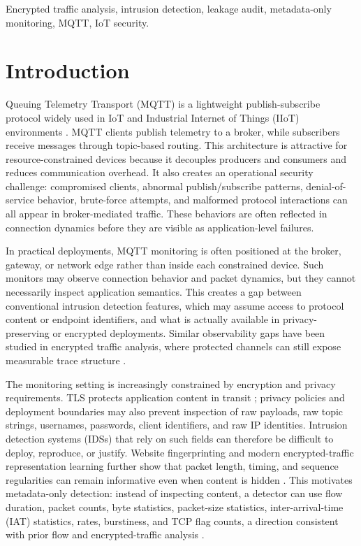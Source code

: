 \documentclass[lettersize,journal]{IEEEtran}
\begin{document}
\begin{IEEEkeywords}
Encrypted traffic analysis, intrusion detection, leakage audit, metadata-only monitoring, MQTT, IoT security.
\end{IEEEkeywords}

\section{Introduction}
\label{sec:introduction}
 Queuing Telemetry Transport (MQTT) is a lightweight publish-subscribe protocol widely used in IoT and Industrial Internet of Things (IIoT) environments \cite{mqtt5,sisinni2018industrial}. MQTT clients publish telemetry to a broker, while subscribers receive messages through topic-based routing. This architecture is attractive for resource-constrained devices because it decouples producers and consumers and reduces communication overhead. It also creates an operational security challenge: compromised clients, abnormal publish/subscribe patterns, denial-of-service behavior, brute-force attempts, and malformed protocol interactions can all appear in broker-mediated traffic. These behaviors are often reflected in connection dynamics before they are visible as application-level failures.

In practical deployments, MQTT monitoring is often positioned at the broker, gateway, or network edge rather than inside each constrained device. Such monitors may observe connection behavior and packet dynamics, but they cannot necessarily inspect application semantics. This creates a gap between conventional intrusion detection features, which may assume access to protocol content or endpoint identifiers, and what is actually available in privacy-preserving or encrypted deployments. Similar observability gaps have been studied in encrypted traffic analysis, where protected channels can still expose measurable trace structure \cite{dyer2012peekaboo}.

The monitoring setting is increasingly constrained by encryption and privacy requirements. TLS protects application content in transit \cite{rfc8446}; privacy policies and deployment boundaries may also prevent inspection of raw payloads, raw topic strings, usernames, passwords, client identifiers, and raw IP identities. Intrusion detection systems (IDSs) that rely on such fields can therefore be difficult to deploy, reproduce, or justify. Website fingerprinting and modern encrypted-traffic representation learning further show that packet length, timing, and sequence regularities can remain informative even when content is hidden \cite{hayes2016kfingerprinting,lin2022etbert}. This motivates metadata-only detection: instead of inspecting content, a detector can use flow duration, packet counts, byte statistics, packet-size statistics, inter-arrival-time (IAT) statistics, rates, burstiness, and TCP flag counts, a direction consistent with prior flow and encrypted-traffic analysis \cite{karagiannis2005blinc,drapergil2016vpn}.
\end{document}
